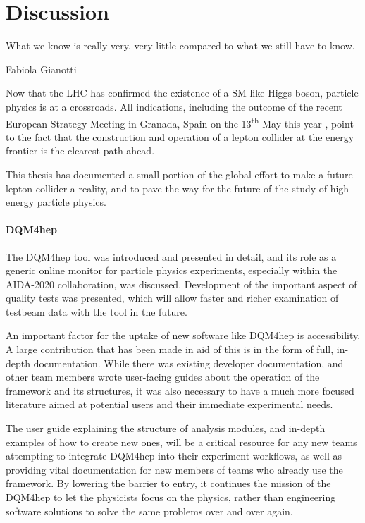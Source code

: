 \chapter{Discussion}
\label{chapter:discussion}

\epigraph{What we know is really very, very little compared to what we still have to know.}{Fabiola Gianotti}

Now that the \acrlong{LHC} has confirmed the existence of a \acrlong{SM}-like Higgs boson, particle physics is at a crossroads. All indications, including the outcome of the recent European Strategy Meeting in Granada, Spain on the 13\textsuperscript{th} May this year \cite{european-strategy}, point to the fact that the construction and operation of a lepton collider at the energy frontier is the clearest path ahead.

This thesis has documented a small portion of the global effort to make a future lepton collider a reality, and to pave the way for the future of the study of high energy particle physics.

\subsubsection*{DQM4hep}
The \acrfull{DQM4hep} tool was introduced and presented in detail, and its role as a generic online monitor for particle physics experiments, especially within the \acrshort{AIDA}-2020 collaboration, was discussed. Development of the important aspect of quality tests was presented, which will allow faster and richer examination of testbeam data with the tool in the future.

An important factor for the uptake of new software like \acrshort{DQM4hep} is accessibility. A large contribution that has been made in aid of this is in the form of full, in-depth documentation. While there was existing developer documentation, and other team members wrote user-facing guides about the operation of the framework and its structures, it was also necessary to have a much more focused literature aimed at potential users and their immediate experimental needs.

The user guide explaining the structure of analysis modules, and in-depth examples of how to create new ones, will be a critical resource for any new teams attempting to integrate \acrshort{DQM4hep} into their experiment workflows, as well as providing vital documentation for new members of teams who already use the framework. By lowering the barrier to entry, it continues the mission of the \acrshort{DQM4hep} to let the physicists focus on the physics, rather than engineering software solutions to solve the same problems over and over again.

